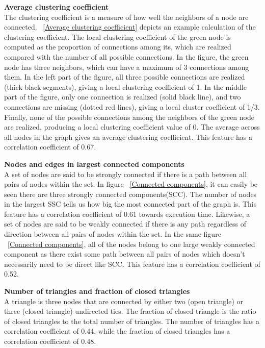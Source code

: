 \textbf{Average clustering coefficient}\\
The clustering coefficient is a measure of how well the neighbors of a node are connected. ~\ref{Average clustering coefficient}  depicts an example calculation of the clustering coefficient. The local clustering coefficient of the green node is computed as the proportion of connections among its, which are realized compared with the number of all possible connections. In the figure, the green node has three neighbors, which can have a maximum of 3 connections among them. In the left part of the figure, all three possible connections are realized (thick black segments), giving a local clustering coefficient of 1. In the middle part of the figure, only one connection is realized (solid black line), and two connections are missing (dotted red lines), giving a local cluster coefficient of 1/3. Finally, none of the possible connections among the neighbors of the green node are realized, producing a local clustering coefficient value of 0. The average across all nodes in the graph gives an average clustering coefficient.  This feature has a correlation coefficient of 0.67.

\textbf{Nodes and edges in largest connected components}\\
A set of nodes are said to be strongly connected if there is a path between all pairs of nodes within the set. In figure ~\ref{Connected components}, it can easily be seen there are three strongly connected components(SCC). The number of nodes in the largest SSC tells us how big the most connected part of the graph is. This feature has a correlation coefficient of 0.61 towards execution time. Likewise, a set of nodes are said to be weakly connected if there is any path regardless of direction between all pairs of nodes within the set. In the same figure ~\ref{Connected components}, all of the nodes belong to one large weakly connected component as there exist some path between all pairs of nodes which doesn't necessarily need to be direct like SCC. This feature has a correlation coefficient of 0.52.

\textbf{Number of triangles and fraction of closed triangles}\\
A triangle is three nodes that are connected by either two (open triangle) or three (closed triangle) undirected ties. The fraction of closed triangle is the ratio of closed triangles to the total number of triangles. The number of triangles has a correlation coefficient of 0.44, while the fraction of closed triangles has a correlation coefficient of 0.48. \\

